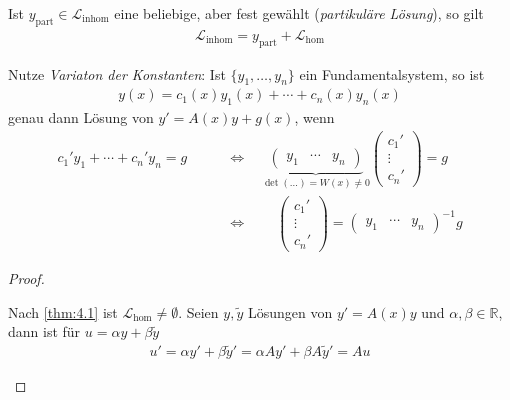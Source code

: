 \begin{theorem}[Satz]
\begin{enum-arab}
\begin{enum-alph}
      Ist $y_{\text{part}} \in \mathcal L_{\text{inhom}}$ eine beliebige, aber fest gewählt (\emph{partikuläre Lösung}), so gilt
      \begin{align*}
        \mathcal L_{\text{inhom}} = y_{\text{part}} + \mathcal L_{\text{hom}}
      \end{align*}
    \item
      Nutze \emph{Variaton der Konstanten}:
      Ist $\{y_1,\dotsc, y_n\}$ ein Fundamentalsystem, so ist
      \begin{align*}
        y(x) = c_1(x) y_1(x) + \dotsb + c_n(x) y_n(x)
      \end{align*}
      genau dann Lösung von $y' = A(x)y + g(x)$, wenn
      \begin{align*}
        c_1'y_1 + \dotsb + c_n'y_n = g
        \qquad &\iff \quad
        \underbrace{\begin{pmatrix}
            y_1 & \cdots & y_n
          \end{pmatrix}}_{\det(\dotsc) = W(x) \neq 0} \begin{pmatrix}
          c_1' \\ \vdots \\ c_n'
        \end{pmatrix} = g \\
        & \iff \qquad \begin{pmatrix}
          c_1' \\ \vdots \\ c_n'
        \end{pmatrix} = \begin{pmatrix}
          y_1 & \cdots & y_n
        \end{pmatrix}^{-1} g
      \end{align*}
    \end{enum-alph}
  \end{enum-arab}
  \begin{proof}
    \begin{enum-arab}
    \item
      \begin{enum-alph}
      \item
        Nach \ref{thm:4.1} ist $\mathcal L_{\text{hom}} \neq \emptyset$.
        Seien $y, \tilde y$ Lösungen von $y' = A(x)y$ und $\alpha, \beta \in \mathbb{R}$, dann ist für $u = \alpha y + \beta \tilde y$
        \begin{align*}
          u' = \alpha y' + \beta \tilde y' = \alpha Ay' + \beta A \tilde y' = Au
        \end{align*}

\end{enum-alph}
\end{enum-arab}
\end{proof}
\end{theorem}
